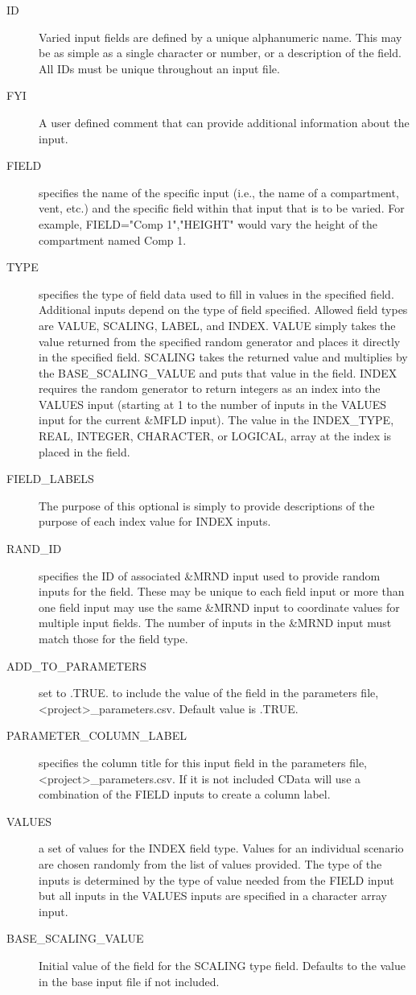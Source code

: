 \documentclass[12pt,twoside]{book}
\begin{document}
\begin{description}
  \item[ID] Varied input fields are defined by a unique alphanumeric name. This may be as simple as a single character or number, or a description of the field. All IDs must be unique throughout an input file.
  \item[FYI] A user defined comment that can provide additional information about the input.
  \item[FIELD] specifies the name of the specific input (i.e., the name of a compartment, vent, etc.) and the specific field within that input that is to be varied. For example, {\ct FIELD="Comp 1","HEIGHT"} would vary the height of the compartment named {\ct Comp 1}.
  \item[TYPE] specifies the type of field data used to fill in values in the specified field. Additional inputs depend on the type of field specified. Allowed field types are {\ct VALUE}, {\ct SCALING}, {\ct LABEL}, and {\ct INDEX}. {\ct VALUE} simply takes the value returned from the specified random generator and places it directly in the specified field. {\ct SCALING} takes the returned value and multiplies by the {\ct BASE\_SCALING\_VALUE} and puts that value in the field. {\ct INDEX} requires the random generator to return integers as an index into the {\ct VALUES} input (starting at 1 to the number of inputs in the {\ct VALUES}       input for the current {\ct \&MFLD} input). The value in the {\ct INDEX\_TYPE}, {\ct REAL}, {\ct INTEGER}, {\ct CHARACTER}, or {\ct LOGICAL}, array at the index is placed in the field.
  \item[FIELD\_LABELS] The purpose of this optional is simply to provide descriptions of the purpose of each index value for {\ct INDEX} inputs.
  \item[RAND\_ID] specifies the ID of associated {\ct \&MRND} input used to provide random inputs for the field. These may be unique to each field input or more than one field input may use the same {\ct \&MRND} input to coordinate values for multiple input fields. The number of inputs in the {\ct \&MRND} input must match those for the field type.
  \item[ADD\_TO\_PARAMETERS] set to .TRUE. to include the value of the field in the parameters file, {\ct <project>\_parameters.csv}. Default value is .TRUE.
  \item[PARAMETER\_COLUMN\_LABEL] specifies the column title for this input field in the parameters file, {\ct <project>\_parameters.csv}. If it is not included CData will use a combination of the {\ct FIELD} inputs to create a column label.
  \item[VALUES] a set of values for the {\ct INDEX} field type. Values for an individual scenario are chosen randomly from the list of values provided. The type of the inputs is determined by the type of value needed from the {\ct FIELD} input but all inputs in the {\ct VALUES} inputs are specified in a character array input.
  \item[BASE\_SCALING\_VALUE] Initial value of the field for the {\ct SCALING} type field. Defaults to the value in the base input file if not included.
\end{description}
\end{document}
